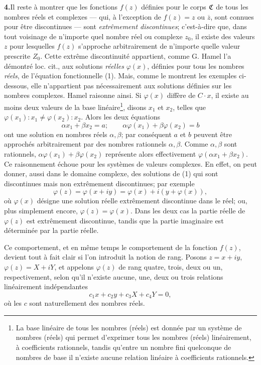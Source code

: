 \medskip
\noindent\textbf{4.}\quad Il reste à montrer que les fonctions $f(z)$ définies pour le corps $\mathfrak{C}$ de tous les nombres réels et complexes --- qui, à l'exception de $f(z)=z$ ou $\overline z$, sont connues pour être discontinues --- sont \emph{extrêmement discontinues}; c'est-à-dire que, dans tout voisinage de n'importe quel nombre réel ou complexe $z_0$, il existe des valeurs $z$ pour lesquelles $f(z)$ s'approche arbitrairement de n'importe quelle valeur prescrite $Z_0$. Cette extrême discontinuité appartient, comme G. Hamel l'a démontré loc. cit., aux solutions \emph{réelles} $\varphi(x)$, définies pour tous les nombres \emph{réels}, de l'équation fonctionnelle (1). Mais, comme le montrent les exemples ci-dessous, elle n'appartient pas nécessairement aux solutions définies sur les nombres complexes. Hamel raisonne ainsi. Si $\varphi(x)$ diffère de $C\cdot x$, il existe au moins deux valeurs de la base linéaire\footnote{La base linéaire de tous les nombres (réels) est donnée par un système de nombres (réels) qui permet d'exprimer tous les nombres (réels) linéairement, à coefficients rationnels, tandis qu'entre un nombre fini quelconque de nombres de base il n'existe aucune relation linéaire à coefficients rationnels.}, disons $x_1$ et $x_2$, telles que $\varphi(x_1):x_1\ne\varphi(x_2):x_2$. Alors les deux équations
\[
\alpha x_1+\beta x_2=a;\qquad \alpha\varphi(x_1)+\beta\varphi(x_2)=b
\]
ont une solution en nombres réels $\alpha,\beta$; par conséquent $a$ et $b$ peuvent être approchés arbitrairement par des nombres rationnels $\alpha,\beta$. Comme $\alpha,\beta$ sont rationnels, $\alpha\varphi(x_1)+\beta\varphi(x_2)$ représente alors effectivement $\varphi(\alpha x_1+\beta x_2)$. Ce raisonnement échoue pour les systèmes de valeurs complexes. En effet, on peut donner, aussi dans le domaine complexe, des solutions de (1) qui sont discontinues mais non extrêmement discontinues; par exemple
\[
\varphi(z)=\varphi(x+iy)=\varphi(x)+i(y+\varphi(x)),
\]
où $\varphi(x)$ désigne une solution réelle extrêmement discontinue dans le réel; ou, plus simplement encore, $\varphi(z)=\varphi(x)$. Dans les deux cas la partie réelle de $\varphi(z)$ est extrêmement discontinue, tandis que la partie imaginaire est déterminée par la partie réelle.

Ce comportement, et en même temps le comportement de la fonction $f(z)$, devient tout à fait clair si l'on introduit la notion de rang. Posons $z=x+iy$, $\varphi(z)=X+iY$, et appelons $\varphi(z)$ de rang quatre, trois, deux ou un, respectivement, selon qu'il n'existe aucune, une, deux ou trois relations linéairement indépendantes
\[
c_1x+c_2y+c_3X+c_4Y=0,
\]
où les $c$ sont naturellement des nombres réels.

